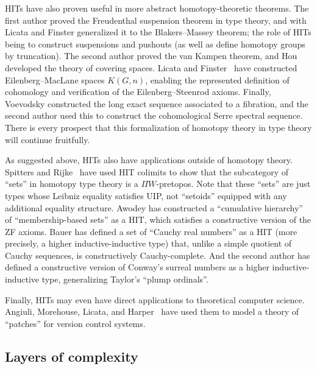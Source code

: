 \documentclass{amsart}
\begin{document}
HITs have also proven useful in more abstract homotopy-theoretic theorems.
The first author proved the Freudenthal suspension theorem in type theory, and with Licata and Finster generalized it to the Blakers--Massey theorem; the role of HITs being to construct suspensions and pushouts (as well as define homotopy groups by truncation).
The second author proved the van Kampen theorem, and Hou developed the theory of covering spaces.
Licata and Finster~\cite{lf:emspaces} have constructed Eilenberg--MacLane spaces $K(G,n)$, enabling the represented definition of cohomology and verification of the Eilenberg--Steenrod axioms.
Finally, Voevodsky constructed the long exact sequence associated to a fibration, and the second author used this to construct the cohomological Serre spectral sequence.
There is every prospect that this formalization of homotopy theory in type theory will continue fruitfully.

As suggested above, HITs also have applications outside of homotopy theory.
Spitters and Rijke~\cite{rs:hottsets} have used HIT colimits to show that the subcategory of ``sets'' in homotopy type theory is a $\Pi W$-pretopos.
Note that these ``sets'' are just types whose Leibniz equality satisfies UIP, not ``setoids'' equipped with any additional equality structure.
Awodey has constructed a ``cumulative hierarchy'' of ``membership-based sets'' as a HIT, which satisfies a constructive version of the ZF axioms.
Bauer has defined a set of ``Cauchy real numbers'' as a HIT (more precisely, a higher inductive-inductive type) that, unlike a simple quotient of Cauchy sequences, is constructively Cauchy-complete.
And the second author has defined a constructive version of Conway's surreal numbers as a higher inductive-inductive type, generalizing Taylor's ``plump ordinals''.

Finally, HITs may even have direct applications to theoretical computer science.
Angiuli, Morehouse, Licata, and Harper~\cite{amlh:htpy-patch} have used them to model a theory of ``patches'' for version control systems.


\subsection{Layers of complexity}
\label{sec:layers-complexity}
\end{document}
